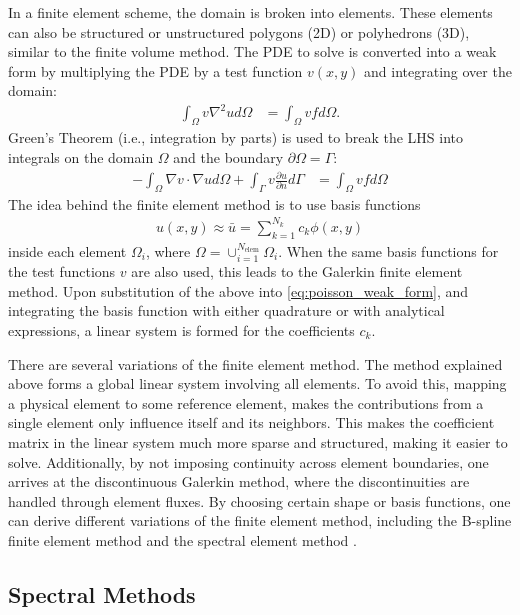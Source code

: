 In a finite element scheme, the domain is broken into elements. These elements can also be structured or unstructured polygons (2D) or polyhedrons (3D), similar to the finite volume method. The PDE to solve is converted into a weak form by multiplying the PDE by a test function $v(x,y)$ and integrating over the domain:
\begin{align}
    \int_{\Omega} v \nabla^2 u d\Omega &= \int_{\Omega} vf d\Omega.
\end{align}
Green's Theorem (i.e., integration by parts) is used to break the LHS into integrals on the domain $\Omega$ and the boundary $\partial \Omega = \Gamma$:
\begin{align}
    -\int_{\Omega} \nabla v \cdot \nabla u d\Omega + \int_{\Gamma} v \frac{\partial u}{\partial n} d\Gamma &= \int_{\Omega} vf d\Omega
    \label{eq:poisson_weak_form}
\end{align}
The idea behind the finite element method is to use basis functions
\begin{align}
    u(x,y) \approx \bar{u} = \sum_{k=1}^{N_k} c_k \phi(x,y)
\end{align}
inside each element $\Omega_i$, where $\Omega = \cup_{i = 1}^{N_{\text{elem}}} \Omega_i$. When the same basis functions for the test functions $v$ are also used, this leads to the Galerkin finite element method. Upon substitution of the above into \ref{eq:poisson_weak_form}, and integrating the basis function with either quadrature or with analytical expressions, a linear system is formed for the coefficients $c_k$.

There are several variations of the finite element method. The method explained above forms a global linear system involving all elements. To avoid this, mapping a physical element to some reference element, makes the contributions from a single element only influence itself and its neighbors. This makes the coefficient matrix in the linear system much more sparse and structured, making it easier to solve. Additionally, by not imposing continuity across element boundaries, one arrives at the discontinuous Galerkin method, where the discontinuities are handled through element fluxes. By choosing certain shape or basis functions, one can derive different variations of the finite element method, including the B-spline finite element method \citep{kagan1998new} and the spectral element method \citep{patera1984spectral}.

\subsection{Spectral Methods}

